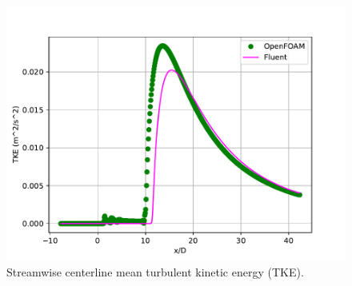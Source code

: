 \documentclass[12pt]{article}
\begin{document}
\begin{figure}[H]
    \centering
    \includegraphics[width=0.925\linewidth]{figs/rhoCentralFoam/TKE.pdf}
    \caption{Streamwise centerline mean turbulent kinetic energy (TKE).}
    \label{fig:tke}
\end{figure}


\end{document}
